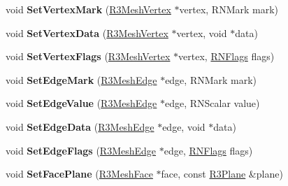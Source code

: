 \begin{DoxyCompactItemize}
\item 
void {\bfseries Set\+Vertex\+Mark} (\hyperlink{class_r3_mesh_vertex}{R3\+Mesh\+Vertex} $\ast$vertex, R\+N\+Mark mark)\hypertarget{class_r3_mesh_af750ad6a2dcc946a3075eacd6ada6f07}{}\label{class_r3_mesh_af750ad6a2dcc946a3075eacd6ada6f07}

\item 
void {\bfseries Set\+Vertex\+Data} (\hyperlink{class_r3_mesh_vertex}{R3\+Mesh\+Vertex} $\ast$vertex, void $\ast$data)\hypertarget{class_r3_mesh_a1d9a5797285d0a100aea17e15e6d8792}{}\label{class_r3_mesh_a1d9a5797285d0a100aea17e15e6d8792}

\item 
void {\bfseries Set\+Vertex\+Flags} (\hyperlink{class_r3_mesh_vertex}{R3\+Mesh\+Vertex} $\ast$vertex, \hyperlink{class_r_n_flags}{R\+N\+Flags} flags)\hypertarget{class_r3_mesh_af143afdb1509b8a3240a938f06b4d32f}{}\label{class_r3_mesh_af143afdb1509b8a3240a938f06b4d32f}

\item 
void {\bfseries Set\+Edge\+Mark} (\hyperlink{class_r3_mesh_edge}{R3\+Mesh\+Edge} $\ast$edge, R\+N\+Mark mark)\hypertarget{class_r3_mesh_a2dfc64db951ae072b8a0b05d203a03fe}{}\label{class_r3_mesh_a2dfc64db951ae072b8a0b05d203a03fe}

\item 
void {\bfseries Set\+Edge\+Value} (\hyperlink{class_r3_mesh_edge}{R3\+Mesh\+Edge} $\ast$edge, R\+N\+Scalar value)\hypertarget{class_r3_mesh_ac66a3ee15378d776d4853b4146c7cd31}{}\label{class_r3_mesh_ac66a3ee15378d776d4853b4146c7cd31}

\item 
void {\bfseries Set\+Edge\+Data} (\hyperlink{class_r3_mesh_edge}{R3\+Mesh\+Edge} $\ast$edge, void $\ast$data)\hypertarget{class_r3_mesh_a251fb05abea0e6889de3752ef799e6a1}{}\label{class_r3_mesh_a251fb05abea0e6889de3752ef799e6a1}

\item 
void {\bfseries Set\+Edge\+Flags} (\hyperlink{class_r3_mesh_edge}{R3\+Mesh\+Edge} $\ast$edge, \hyperlink{class_r_n_flags}{R\+N\+Flags} flags)\hypertarget{class_r3_mesh_a5ff1c2bc4bf652a535f075ca421bd662}{}\label{class_r3_mesh_a5ff1c2bc4bf652a535f075ca421bd662}

\item 
void {\bfseries Set\+Face\+Plane} (\hyperlink{class_r3_mesh_face}{R3\+Mesh\+Face} $\ast$face, const \hyperlink{class_r3_plane}{R3\+Plane} \&plane)\hypertarget{class_r3_mesh_a380083a9659d2a85b87b11db3bd3f521}{}\label{class_r3_mesh_a380083a9659d2a85b87b11db3bd3f521}


\end{DoxyCompactItemize}
